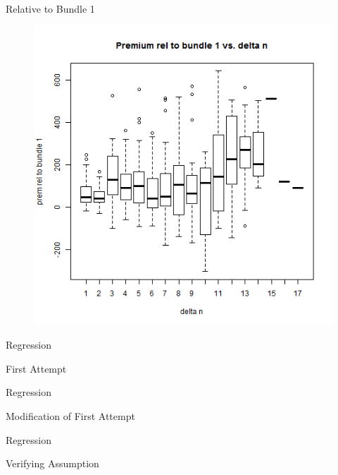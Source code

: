 \documentclass[xcolor=dvipsnames,11pt]{beamer}
\theoremstyle{definition}
\begin{document}
\begin{frame}{Relative to Bundle 1}
\begin{figure}

\includegraphics[scale=0.43]{rel1_7_boxplot_delta_n_premrel1}
\end{figure}
\end{frame}

\begin{frame}{Regression}

\centering
First Attempt

\medskip

\scalebox{0.8}{

}
\end{frame}


\begin{frame}{Regression}

\centering
Modification of First Attempt

\medskip

\scalebox{0.7}{

}
\end{frame}


\begin{frame}{Regression}

\centering
Verifying Assumption

\medskip

\scalebox{0.8}{

}
\end{frame}
\end{document}
